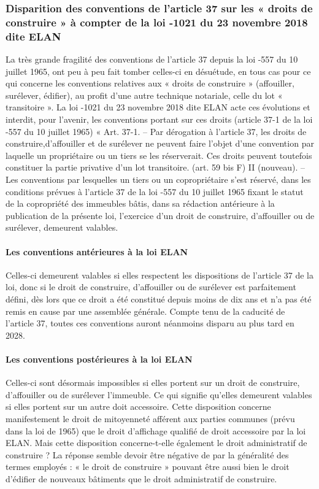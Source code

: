 	\subsubsection{Disparition des conventions de l’article 37 sur les « droits de construire » à compter de la loi -1021 du 23 novembre 2018 dite ELAN}
	
	La très grande fragilité des conventions de l’article 37 depuis la loi -557 du 10 juillet 1965, ont peu à
	peu fait tomber celles-ci en désuétude, en tous cas pour ce qui concerne les conventions relatives aux
	« droits de construire » (affouiller, surélever, édifier), au profit d’une autre technique notariale, celle du
	lot « transitoire ». La loi -1021 du 23 novembre 2018 dite ELAN acte ces évolutions et interdit,
	pour l’avenir, les conventions portant sur ces droits (article 37-1 de la loi -557 du 10 juillet 1965)
	« Art. 37-1. – Par dérogation à l’article 37, les droits de construire,d’affouiller et de
	surélever ne peuvent faire l’objet d'une convention par laquelle un propriétaire ou un tiers
	se les réserverait. Ces droits peuvent toutefois constituer la partie privative d’un lot
	transitoire. (art. 59 bis F)
	II (nouveau). – Les conventions par lesquelles un tiers ou un copropriétaire s’est réservé,
	dans les conditions prévues à l’article 37 de la loi -557 du 10 juillet 1965 fixant le statut
	de la copropriété des immeubles bâtis, dans sa rédaction antérieure à la publication de la
	présente loi, l’exercice d’un droit de construire, d’affouiller ou de surélever, demeurent
	valables.
	
	\paragraph{Les conventions antérieures à la loi ELAN}
	Celles-ci demeurent valables si elles respectent les dispositions de l’article 37 de la loi, donc si le droit de
	construire, d’affouiller ou de surélever est parfaitement défini, dès lors que ce droit a été constitué depuis
	moins de dix ans et n’a pas été remis en cause par une assemblée générale. Compte tenu de la caducité
	de l’article 37, toutes ces conventions auront néanmoins disparu au plus tard en 2028.
	
	\paragraph{Les conventions postérieures à la loi ELAN}
	Celles-ci sont désormais impossibles si elles portent sur un droit de construire, d’affouiller ou de surélever
	l’immeuble. Ce qui signifie qu’elles demeurent valables si elles portent sur un autre doit accessoire.
	Cette disposition concerne manifestement le droit de mitoyenneté afférent aux parties communes (prévu
	dans la loi de 1965) que le droit d’affichage qualifié de droit accessoire par la loi ELAN.
	Mais cette disposition concerne-t-elle également le droit administratif de construire ? La réponse semble
	devoir être négative de par la généralité des termes employés : « le droit de construire » pouvant être
	aussi bien le droit d’édifier de nouveaux bâtiments que le droit administratif de construire.

